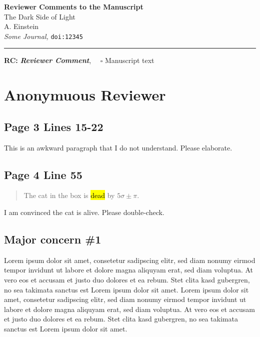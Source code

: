\documentclass{article}
\begin{document}
{\Large\bf Reviewer Comments to the Manuscript}\\[1em]
{\huge The Dark Side of Light}\\[1em]
{A. Einstein}\\
{\it Some Journal, }\texttt{doi:12345}\\
\hrule

\hfill {\bfseries RC:} \textbf{\textit{Reviewer Comment}}, \(\quad\square\) Manuscript text


\section{Anonymuous Reviewer}

\subsection{Page 3 Lines 15-22}

\RC This is an awkward paragraph that I do not understand. Please elaborate.

\subsection{Page 4 Line 55}

\begin{quote}
The cat in the box is \hl{dead} by $5\sigma\pm\pi$.
\end{quote}

\RC I am convinced the cat is alive. Please double-check.


\subsection{Major concern \#1}

\RC Lorem ipsum dolor sit amet, consetetur sadipscing elitr, sed diam nonumy eirmod tempor invidunt ut labore et dolore magna aliquyam erat, sed diam voluptua. At vero eos et accusam et justo duo dolores et ea rebum. Stet clita kasd gubergren, no sea takimata sanctus est Lorem ipsum dolor sit amet. Lorem ipsum dolor sit amet, consetetur sadipscing elitr, sed diam nonumy eirmod tempor invidunt ut labore et dolore magna aliquyam erat, sed diam voluptua. At vero eos et accusam et justo duo dolores et ea rebum. Stet clita kasd gubergren, no sea takimata sanctus est Lorem ipsum dolor sit amet.
\end{document}
